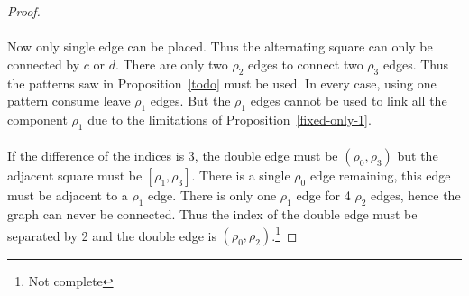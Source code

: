 \begin{proof}
  \begin{figure}[H]
    \begin{center}
      \caption{}
    \end{center}
  \end{figure}

  \paragraph{}
  Now only single edge can be placed. Thus the alternating square can only be connected by $c$ or $d$. There are only two $\rho_2$ edges to connect two $\rho_3$ edges. Thus the patterns saw in Proposition~\ref{todo} must be used. In every case, using one pattern consume leave $\rho_1$ edges. But the $\rho_1$ edges cannot be used to link all the component $\rho_1$ due to the limitations of Proposition~\ref{fixed-only-1}.

  \paragraph{}
  If the difference of the indices is 3, the double edge must be $(\rho_0, \rho_3)$ but the adjacent square must be $[\rho_1, \rho_3]$. There is a single $\rho_0$ edge remaining, this edge must be adjacent to a $\rho_1$ edge. There is only one $\rho_1$ edge for 4 $\rho_2$ edges, hence the graph can never be connected. Thus the index of the double edge must be separated by 2 and the double edge is $(\rho_0, \rho_2)$.\footnote{Not complete}


\end{proof}
